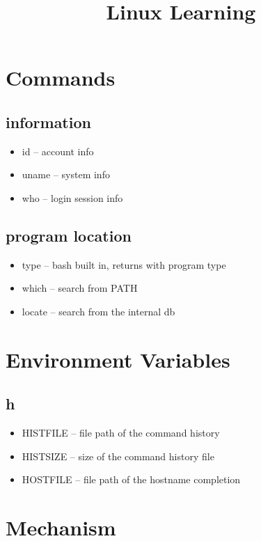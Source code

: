 \documentclass[titlepage]{article}
\begin{document}
	\title{Linux Learning}
	\maketitle
	
	\section{Commands}
	  \subsection{information}
	    \begin{itemize}
	    	\item id -- account info
	    	\item uname -- system info
	    	\item who -- login session info
	    \end{itemize}
    
      \subsection{program location}
        \begin{itemize}
        	\item type -- bash built in, returns with program type
        	\item which -- search from PATH
        	\item locate -- search from the internal db
        \end{itemize}
    
    \section{Environment Variables}
      \subsection{h}
        \begin{itemize}
        	\item HISTFILE -- file path of the command history
        	\item HISTSIZE -- size of the command history file
        	\item HOSTFILE -- file path of the hostname completion
        \end{itemize}
    
    \section{Mechanism}
\end{document}
